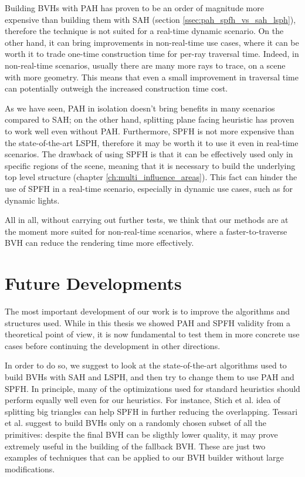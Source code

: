 \documentclass{PoliMi_MasterThesis}
\begin{document}
Building BVHs with PAH has proven to be an order of magnitude more expensive than building them with SAH (section \ref{ssec:pah_spfh_vs_sah_lsph}), therefore the technique is not suited for a real-time dynamic scenario. On the other hand, it can bring improvements in non-real-time use cases, where it can be worth it to trade one-time construction time for per-ray traversal time. Indeed, in non-real-time scenarios, usually there are many more rays to trace, on a scene with more geometry. This means that even a small improvement in traversal time can potentially outweigh the increased construction time cost.

As we have seen, PAH in isolation doesn't bring benefits in many scenarios compared to SAH; on the other hand, splitting plane facing heuristic has proven to work well even without PAH. Furthermore, SPFH is not more expensive than the state-of-the-art LSPH, therefore it may be worth it to use it even in real-time scenarios. The drawback of using SPFH is that it can be effectively used only in specific regions of the scene, meaning that it is necessary to build the underlying top level structure (chapter \ref{ch:multi_influence_areas}). This fact can hinder the use of SPFH in a real-time scenario, especially in dynamic use cases, such as for dynamic lights.

All in all, without carrying out further tests, we think that our methods are at the moment more suited for non-real-time scenarios, where a faster-to-traverse BVH can reduce the rendering time more effectively.

\section{Future Developments} \label{sec:future_developments}
The most important development of our work is to improve the algorithms and structures used. While in this thesis we showed PAH and SPFH validity from a theoretical point of view, it is now fundamental to test them in more concrete use cases before continuing the development in other directions.

In order to do so, we suggest to look at the state-of-the-art algorithms used to build BVHs with SAH and LSPH, and then try to change them to use PAH and SPFH. In principle, many of the optimizations used for standard heuristics should perform equally well even for our heuristics. For instance, Stich et al. \cite{bvh_spatial_splitting} idea of splitting big triangles can help SPFH in further reducing the overlapping. Tessari et al. \cite{stochastic_bvh_construction} suggest to build BVHs only on a randomly chosen subset of all the primitives: despite the final BVH can be sligthly lower quality, it may prove extremely useful in the building of the fallback BVH. These are just two examples of techniques that can be applied to our BVH builder without large modifications. 
\end{document}
